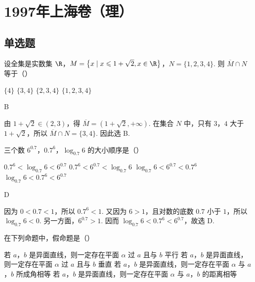 \documentclass[UTF8,a4paper,oneside,11pt]{ctexbook}
\begin{document}
\mainmatter

\chapter{1997年上海卷（理）}
\section{单选题}

\begin{problem}
设全集是实数集 \(\R\)，\(M=\left\{x \mid x \leqslant 1+\sqrt{2}, x \in \R\right\}\)，\(N=\{1,2,3,4\}\). 则 \(\overline{M} \cap N\) 等于（\quad）

\choices
    {\(\{4\}\)}
    {\(\{3,4\}\)}
    {\(\{2,3,4\}\)}
    {\(\{1,2,3,4\}\)}
\end{problem}

\begin{answer}
B
\end{answer}

\begin{solution}
由 \(1+\sqrt{2}\in(2,3)\)，得 \(\overline{M}=(1+\sqrt{2},+\infty)\). 在集合 \(N\) 中，只有 \(3\)，\(4\) 大于 \(1+\sqrt{2}\)，所以 \(\overline{M}\cap N=\{3,4\}\). 因此选 B.
\end{solution}

\begin{problem}
三个数 \(6^{0.7}\)，\(0.7^{6}\)，\(\log_{0.7}6\) 的大小顺序是（\quad）

\choices
    {\(0.7^6 < \log_{0.7}6 < 6^{0.7}\)}
    {\(0.7^6 < 6^{0.7} < \log_{0.7}6\)}
    {\(\log_{0.7}6 < 6^{0.7} < 0.7^6\)}
    {\(\log_{0.7}6 < 0.7^6 < 6^{0.7}\)}
\end{problem}

\begin{answer}
D
\end{answer}

\begin{solution}
因为 \(0<0.7<1\)，所以 \(0.7^6<1\). 又因为 \(6>1\)，且对数的底数 \(0.7\) 小于 \(1\)，所以 \(\log_{0.7}6<0\). 另一方面，\(6^{0.7}>1\). 因而
\(\log_{0.7}6<0.7^6<6^{0.7}\)，故选 D.
\end{solution}

\begin{problem}
在下列命题中，假命题是（\quad）

\choices
    {若 \(a\)，\(b\) 是异面直线，则一定存在平面 \(\alpha\) 过 \(a\) 且与 \(b\) 平行}
    {若 \(a\)，\(b\) 是异面直线，则一定存在平面 \(\alpha\) 过 \(a\) 且与 \(b\) 垂直}
    {若 \(a\)，\(b\) 是异面直线，则一定存在平面 \(\alpha\) 与 \(a\)，\(b\) 所成角相等}
    {若 \(a\)，\(b\) 是异面直线，则一定存在平面 \(\alpha\) 与 \(a\)，\(b\) 的距离相等}
\end{problem}
\end{document}
